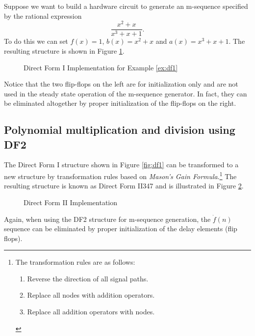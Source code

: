 \begin{example}
\label{ex:df1}
Suppose we want to build a hardware circuit to 
generate an m-sequence specified by the rational expression
\[ \frac{x^2+x}{x^3+x+1}. \]
To do this we can set $f(x)=1$, $b(x)=x^2+x$ and $a(x)=x^3+x+1$.
The resulting structure is shown in Figure \ref{fig:ex-df1}.
\begin{figure}[ht]
\caption{
   Direct Form I Implementation for Example \ref{ex:df1}
   \label{fig:ex-df1}
   }
\end{figure}
Notice that the two flip-flops on the left are for initialization 
only and are not used in the steady state operation of the m-sequence
generator.
In fact, they can be eliminated altogether by proper initialization of 
the flip-flops on the right.
\end{example}

\subsection{Polynomial multiplication and division using DF2}
\label{sec:df2}
The Direct Form I structure shown in Figure \ref{fig:df1} can be transformed
to a new structure by transformation rules based on 
{\em Mason's Gain Formula}.\footnote{
   The transformation rules are as follows:
   \begin{enumerate}
   \setlength{\itemsep}{0ex}
   \item Reverse the direction of all signal paths.
   \item Replace all nodes with addition operators.
   \item Replace all addition operators with nodes.
   \end{enumerate}
   \cite[p.363]{os}
   }
The resulting structure is known as Direct Form II\citep{os}{347} 
and is illustrated in 
Figure \ref{fig:df2}.
\begin{figure}[ht]
\caption{
   Direct Form II Implementation
   \label{fig:df2}
   }
\end{figure}
Again, when using the DF2 structure for m-sequence generation,
the $\dot{f}(n)$ sequence can be eliminated by proper initialization of
the delay elements (flip flops).

